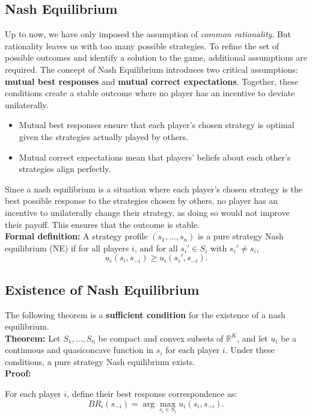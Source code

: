 \documentclass{article}
\begin{document}
\subsection{Nash Equilibrium}\label{nash}
Up to now, we have only imposed the assumption of \textit{common rationality}. But rationality leaves us with too many possible strategies. To refine the set of possible outcomes and identify a solution to the game, additional assumptions are required. The concept of Nash Equilibrium introduces two critical assumptions: \textbf{mutual best responses} and \textbf{mutual correct expectations}. Together,
these conditions create a stable outcome where no player has an incentive to deviate unilaterally.
\begin{itemize}
    \item Mutual best responses ensure that each player’s chosen strategy is optimal given the strategies actually played by others.
    \item Mutual correct expectations mean that players’ beliefs about each other’s strategies align perfectly.
\end{itemize} 
Since a nash equilibrium is a situation where each player's chosen strategy is the best possible response to the strategies chosen by others, no player has an incentive to unilaterally change their strategy, as doing so would not improve their payoff. This ensures that the outcome is stable.
\\

\textbf{Formal definition:} A strategy profile \((s_1, \ldots, s_n)\) is a pure strategy Nash equilibrium (NE) if for all players \(i\), and for all \(s_i' \in S_i\) with \(s_i' \neq s_i\),
\[
    u_i(s_i, s_{-i}) \geq u_i(s_i', s_{-i}).
\]
 
\subsection{Existence of Nash Equilibrium}

The following theorem is a \textbf{sufficient condition} for the existence of a nash equilibrium. \\

\textbf{Theorem:} Let \(S_1, \ldots, S_n\) be compact and convex subsets of \(\mathbb{R}^K\), and let \(u_i\) be a continuous and quasiconcave function in \(s_i\) for each player \(i\). Under these conditions, a pure strategy Nash equilibrium exists.
\\
\textbf{Proof:}

For each player \(i\), define their best response correspondence as:
\[
    BR_i(s_{-i}) = \arg\max_{s_i \in S_i} u_i(s_i, s_{-i}).
\]
\end{document}
